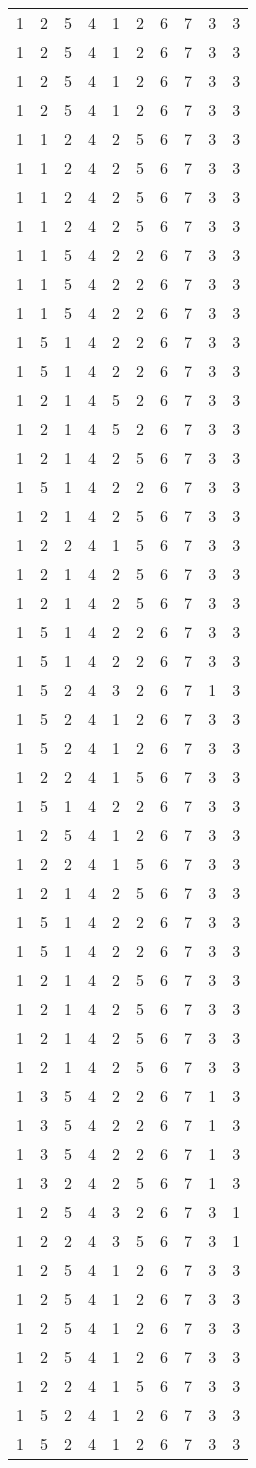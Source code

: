 \begin{longtable}[]{@{}llllllllll@{}}
1 & 2 & 5 & 4 & 1 & 2 & 6 & 7 & 3 & 3\tabularnewline
1 & 2 & 5 & 4 & 1 & 2 & 6 & 7 & 3 & 3\tabularnewline
1 & 2 & 5 & 4 & 1 & 2 & 6 & 7 & 3 & 3\tabularnewline
1 & 2 & 5 & 4 & 1 & 2 & 6 & 7 & 3 & 3\tabularnewline
1 & 1 & 2 & 4 & 2 & 5 & 6 & 7 & 3 & 3\tabularnewline
1 & 1 & 2 & 4 & 2 & 5 & 6 & 7 & 3 & 3\tabularnewline
1 & 1 & 2 & 4 & 2 & 5 & 6 & 7 & 3 & 3\tabularnewline
1 & 1 & 2 & 4 & 2 & 5 & 6 & 7 & 3 & 3\tabularnewline
1 & 1 & 5 & 4 & 2 & 2 & 6 & 7 & 3 & 3\tabularnewline
1 & 1 & 5 & 4 & 2 & 2 & 6 & 7 & 3 & 3\tabularnewline
1 & 1 & 5 & 4 & 2 & 2 & 6 & 7 & 3 & 3\tabularnewline
1 & 5 & 1 & 4 & 2 & 2 & 6 & 7 & 3 & 3\tabularnewline
1 & 5 & 1 & 4 & 2 & 2 & 6 & 7 & 3 & 3\tabularnewline
1 & 2 & 1 & 4 & 5 & 2 & 6 & 7 & 3 & 3\tabularnewline
1 & 2 & 1 & 4 & 5 & 2 & 6 & 7 & 3 & 3\tabularnewline
1 & 2 & 1 & 4 & 2 & 5 & 6 & 7 & 3 & 3\tabularnewline
1 & 5 & 1 & 4 & 2 & 2 & 6 & 7 & 3 & 3\tabularnewline
1 & 2 & 1 & 4 & 2 & 5 & 6 & 7 & 3 & 3\tabularnewline
1 & 2 & 2 & 4 & 1 & 5 & 6 & 7 & 3 & 3\tabularnewline
1 & 2 & 1 & 4 & 2 & 5 & 6 & 7 & 3 & 3\tabularnewline
1 & 2 & 1 & 4 & 2 & 5 & 6 & 7 & 3 & 3\tabularnewline
1 & 5 & 1 & 4 & 2 & 2 & 6 & 7 & 3 & 3\tabularnewline
1 & 5 & 1 & 4 & 2 & 2 & 6 & 7 & 3 & 3\tabularnewline
1 & 5 & 2 & 4 & 3 & 2 & 6 & 7 & 1 & 3\tabularnewline
1 & 5 & 2 & 4 & 1 & 2 & 6 & 7 & 3 & 3\tabularnewline
1 & 5 & 2 & 4 & 1 & 2 & 6 & 7 & 3 & 3\tabularnewline
1 & 2 & 2 & 4 & 1 & 5 & 6 & 7 & 3 & 3\tabularnewline
1 & 5 & 1 & 4 & 2 & 2 & 6 & 7 & 3 & 3\tabularnewline
1 & 2 & 5 & 4 & 1 & 2 & 6 & 7 & 3 & 3\tabularnewline
1 & 2 & 2 & 4 & 1 & 5 & 6 & 7 & 3 & 3\tabularnewline
1 & 2 & 1 & 4 & 2 & 5 & 6 & 7 & 3 & 3\tabularnewline
1 & 5 & 1 & 4 & 2 & 2 & 6 & 7 & 3 & 3\tabularnewline
1 & 5 & 1 & 4 & 2 & 2 & 6 & 7 & 3 & 3\tabularnewline
1 & 2 & 1 & 4 & 2 & 5 & 6 & 7 & 3 & 3\tabularnewline
1 & 2 & 1 & 4 & 2 & 5 & 6 & 7 & 3 & 3\tabularnewline
1 & 2 & 1 & 4 & 2 & 5 & 6 & 7 & 3 & 3\tabularnewline
1 & 2 & 1 & 4 & 2 & 5 & 6 & 7 & 3 & 3\tabularnewline
1 & 3 & 5 & 4 & 2 & 2 & 6 & 7 & 1 & 3\tabularnewline
1 & 3 & 5 & 4 & 2 & 2 & 6 & 7 & 1 & 3\tabularnewline
1 & 3 & 5 & 4 & 2 & 2 & 6 & 7 & 1 & 3\tabularnewline
1 & 3 & 2 & 4 & 2 & 5 & 6 & 7 & 1 & 3\tabularnewline
1 & 2 & 5 & 4 & 3 & 2 & 6 & 7 & 3 & 1\tabularnewline
1 & 2 & 2 & 4 & 3 & 5 & 6 & 7 & 3 & 1\tabularnewline
1 & 2 & 5 & 4 & 1 & 2 & 6 & 7 & 3 & 3\tabularnewline
1 & 2 & 5 & 4 & 1 & 2 & 6 & 7 & 3 & 3\tabularnewline
1 & 2 & 5 & 4 & 1 & 2 & 6 & 7 & 3 & 3\tabularnewline
1 & 2 & 5 & 4 & 1 & 2 & 6 & 7 & 3 & 3\tabularnewline
1 & 2 & 2 & 4 & 1 & 5 & 6 & 7 & 3 & 3\tabularnewline
1 & 5 & 2 & 4 & 1 & 2 & 6 & 7 & 3 & 3\tabularnewline
1 & 5 & 2 & 4 & 1 & 2 & 6 & 7 & 3 & 3\tabularnewline

\end{longtable}
